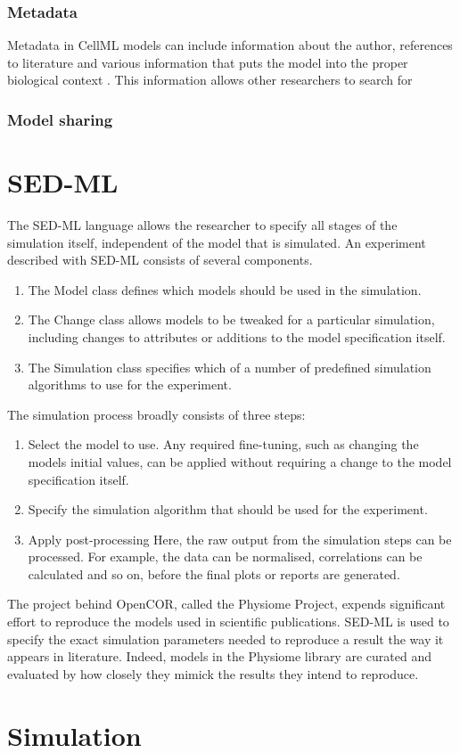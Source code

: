 \documentclass[\rootfolder/main.tex]{subfiles}
\begin{document}
\subsubsection{Metadata}

Metadata in CellML models can include information about the author, references to literature and various information that puts the model into the proper biological context \cite{cuellar2003}.
This information allows other researchers to search for

\subsubsection{Model sharing}

\section{SED-ML}

The SED-ML language allows the researcher to specify all stages of the simulation itself, independent of the model that is simulated.
An experiment described with SED-ML consists of several components.

\begin{enumerate}
    \item The Model class defines which models should be used in the simulation.
    \item The Change class allows models to be tweaked for a particular simulation, including changes to attributes or additions to the model specification itself.
    \item The Simulation class specifies which of a number of predefined simulation algorithms to use for the experiment. \cite{sedml-specification}
\end{enumerate}

The simulation process broadly consists of three steps:

\begin{enumerate}
    \item Select the model to use. Any required fine-tuning, such as changing the models initial values, can be applied without requiring a change to the model specification itself.
    \item Specify the simulation algorithm that should be used for the experiment.
    \item Apply post-processing
        Here, the raw output from the simulation steps can be processed. For example, the data can be normalised,
        correlations can be calculated and so on, before the final plots or reports are generated.
\end{enumerate}

The project behind OpenCOR, called the Physiome Project, expends significant effort to reproduce the models used in scientific publications.
SED-ML is used to specify the exact simulation parameters needed to reproduce a result the way it appears in literature.
Indeed, models in the Physiome library are curated and evaluated by how closely they mimick the results they intend to reproduce.

\section{Simulation}
\end{document}
